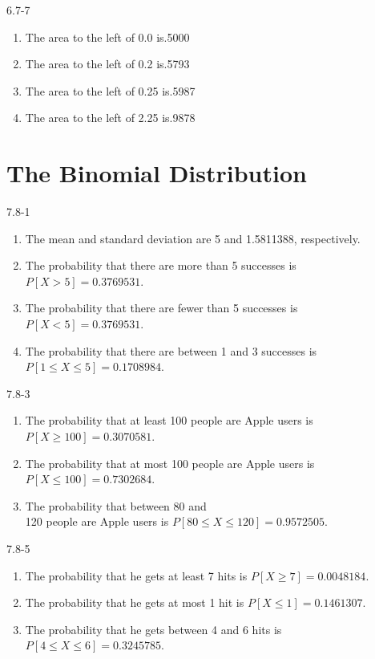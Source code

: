 \begin{exsol@solution}{6.7-7}
\begin{enumerate}
\item The area to the left of 0.0 is.5000
\item The area to the left of 0.2 is.5793
\item The area to the left of 0.25 is.5987
\item The area to the left of 2.25 is.9878
\end{enumerate}
\end{exsol@solution}
\setcounter{chapter}{7}\chapter{The Binomial Distribution}
\begin{exsol@solution}{7.8-1}

		\begin{enumerate}
	  \item The mean and standard deviation are 5 and 1.5811388, respectively.
    \item The probability that there are more than 5 successes is $P[ X > 5 ] = 0.3769531$.
    \item The probability that there are fewer than 5 successes is $P[ X < 5 ] = 0.3769531$.
    \item The probability that there  are between 1 and 3 successes  is $P[ 1 \le X \le 5 ] = 0.1708984$.
	  \end{enumerate}
\end{exsol@solution}
\begin{exsol@solution}{7.8-3}

\begin{enumerate}
\item The probability that at least 100 people are Apple users is $P[X \ge 100] = 0.3070581$.
\item The probability that at most 100 people are Apple users is $P[X \le 100] = 0.7302684$.
\item The probability that between 80 and \\ 120 people are Apple users is $P[ 80 \le X \le 120] = 0.9572505$.
\end{enumerate}
\end{exsol@solution}
\begin{exsol@solution}{7.8-5}

\begin{enumerate}
\item The probability that he gets at least 7 hits is $P[X \ge 7] = 0.0048184$.
\item The probability that he gets at most 1 hit is $P[X \le 1] = 0.1461307$.
\item The probability that he gets between 4 and 6 hits is $P[4 \le X \le 6] = 0.3245785$.
\end{enumerate}

\end{exsol@solution}
